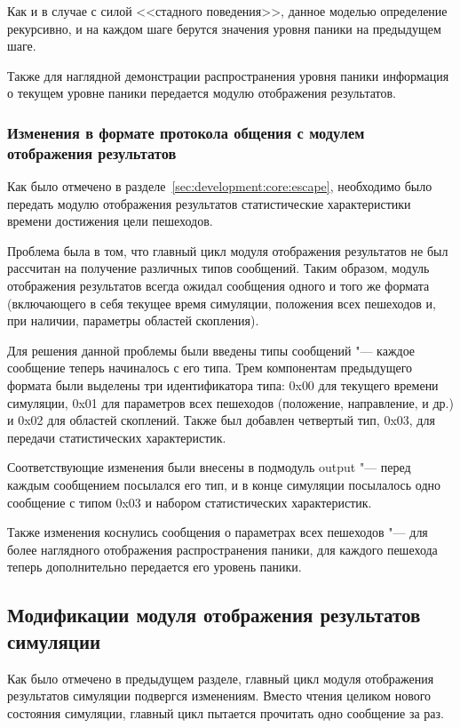 Как и в случае с силой <<стадного поведения>>, данное моделью определение рекурсивно,
и на каждом шаге берутся значения уровня паники на предыдущем шаге.

Также для наглядной демонстрации распространения уровня паники информация о текущем уровне паники передается модулю отображения результатов.

\subsubsection{Изменения в формате протокола общения с модулем отображения результатов}
\label{sec:development:core:output}

Как было отмечено в разделе~\ref{sec:development:core:escape}, необходимо было передать модулю отображения результатов
статистические характеристики времени достижения цели пешеходов.

Проблема была в том, что главный цикл модуля отображения результатов не был рассчитан на получение различных типов сообщений.
Таким образом, модуль отображения результатов всегда ожидал сообщения одного и того же формата
(включающего в себя текущее время симуляции, положения всех пешеходов и, при наличии, параметры областей скопления).

Для решения данной проблемы были введены типы сообщений "--- каждое сообщение теперь начиналось с его типа.
Трем компонентам предыдущего формата были выделены три идентификатора типа:
0x00 для текущего времени симуляции, 0x01 для параметров всех пешеходов (положение, направление, и др.) и 0x02 для областей скоплений.
Также был добавлен четвертый тип, 0x03, для передачи статистических характеристик.

Соответствующие изменения были внесены в подмодуль out\-put "--- перед каждым сообщением посылался его тип,
и в конце симуляции посылалось одно сообщение с типом 0x03 и набором статистических характеристик.

Также изменения коснулись сообщения о параметрах всех пешеходов "--- для более наглядного отображения распространения паники,
для каждого пешехода теперь дополнительно передается его уровень паники.

\subsection{Модификации модуля отображения результатов симуляции}
\label{sec:development:animator}

Как было отмечено в предыдущем разделе, главный цикл модуля отображения результатов симуляции подвергся изменениям.
Вместо чтения целиком нового состояния симуляции, главный цикл пытается прочитать одно сообщение за раз.

